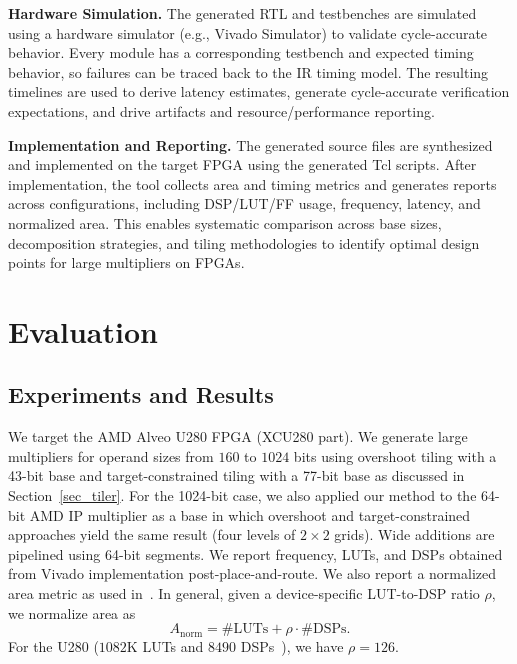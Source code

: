 \documentclass[sigconf,9pt,review]{acmart}
\begin{document}
\noindent\textbf{Hardware Simulation.}
The generated RTL and testbenches are simulated using a hardware simulator (e.g., Vivado Simulator) to validate cycle-accurate behavior.
Every module has a corresponding testbench and expected timing behavior, so failures can be traced back to the IR timing model.
The resulting timelines are used to derive latency estimates, generate cycle-accurate verification expectations, and drive artifacts and resource/performance reporting.

\noindent\textbf{Implementation and Reporting.}
The generated source files are synthesized and implemented on the target FPGA using the generated Tcl scripts.
After implementation, the tool collects area and timing metrics and generates reports across configurations, including DSP/LUT/FF usage, frequency, latency, and normalized area.
This enables systematic comparison across base sizes, decomposition strategies, and tiling methodologies to identify optimal design points for large multipliers on FPGAs.














% 
\section{Evaluation}
\subsection{Experiments and Results}
We target the AMD Alveo U280 FPGA (XCU280 part).
We generate large multipliers for operand sizes from $160$ to $1024$ bits using overshoot tiling with a 43-bit base and target-constrained tiling with a 77-bit base as discussed in Section~\ref{sec_tiler}.
For the 1024-bit case, we also applied our method to the 64-bit AMD IP multiplier as a base in which overshoot and target-constrained approaches yield the same result (four levels of $2\times2$ grids).
Wide additions are pipelined using 64-bit segments.
We report frequency, LUTs, and DSPs obtained from Vivado implementation post-place-and-route.
We also report a normalized area metric as used in~\cite{fahmyMapDSPMaxPerformance2016,zhangIMpressLargeInteger2022}.
In general, given a device-specific LUT-to-DSP ratio $\rho$, we normalize area as
\[
A_{\text{norm}} = \#\text{LUTs} + \rho \cdot \#\text{DSPs}.
\]
For the U280 ($1082$K LUTs and $8490$ DSPs~\cite{U280SwitchingCharacteristics}), we have $\rho=126$.
\end{document}
